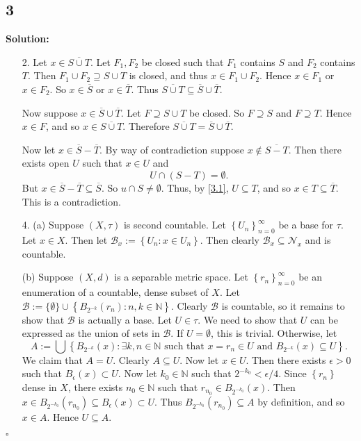 \documentclass[12pt]{article}
\newcounter{ProofCounter}
\newenvironment{Solution}{\stepcounter{ProofCounter}\textbf{Solution:}}{\hfill$\square$}
\begin{document}
\subsection*{3}
\begin{Solution}
  \begin{enumerate}
    \item[2.] Let $x \in \overline{S\cup T}$. Let $F_1, F_2$ be closed such that $F_1$ contains $S$ and $F_2$ contains $T$. Then $F_1 \cup F_2
      \supseteq S\cup T$ is closed, and thus $x \in F_1 \cup F_2$. Hence $x \in F_1$ or $x \in F_2$. So $x \in \overline{S}$ or $x \in \overline{T}$. Thus 
      $\overline{S\cup T} \subseteq \overline{S} \cup \overline{T}$.

      Now suppose $x \in \overline{S} \cup \overline{T}$. Let $F \supseteq S\cup T$ be closed. So $F \supseteq S$ and $F \supseteq T$. Hence $x \in
      F$, and so $x \in \overline{S\cup T}$. Therefore $\overline{S\cup T} = \overline{S} \cup \overline{T}$.

      Now let $x \in \overline{S} - \overline{T}$. By way of contradiction suppose $x \notin \overline{S - T}$. Then there exists open $U$ such that
      $x \in U$ and
      \begin{equation}
        U \cap (S - T) = \emptyset.
        \label{3.1}
      \end{equation}
      But $x \in \overline{S} - \overline{T} \subseteq \overline{S}$. So $u \cap S \neq \emptyset$. Thus, by \eqref{3.1}, $U \subseteq T$, and so $x
      \in T \subseteq \overline{T}$. This is a contradiction.

    \item[4.] (a) Suppose $(X, \tau)$ is second countable. Let $\left\{ U_n \right\}_{n=0}^{\infty}$ be a base for $\tau$. Let $x \in X$. Then let
      $\mathcal{B}_{x} := \left\{ U_{n} : x \in U_n \right\}$. Then clearly $\mathcal{B}_x \subseteq \mathcal{N}_{x}$ and is countable.

      (b) Suppose $(X, d)$ is a separable metric space. Let $\left\{ r_n \right\}_{n=0}^{\infty}$ be an enumeration of a countable, dense subset of
      $X$. Let $\mathcal{B} := \{\emptyset\} \cup \left\{ B_{2^{-k}}(r_n) : n, k \in \mathbb{N} \right\}$. Clearly $\mathcal{B}$ is countable, so it remains to show that
      $\mathcal{B}$ is actually a base. Let $U \in \tau$. We need to show that $U$ can be expressed as the union of sets in $\mathcal{B}$. If $U =
      \emptyset$, this is trivial. Otherwise, let
      \[
        A := \bigcup \left\{ B_{2^{-k}}(x) : \exists k, n \in \mathbb{N} \text{ such that } x  = r_n \in U \text{ and } B_{2^{-k}}(x) \subseteq
        U\right\}.
      \]
      We claim that $A = U$. Clearly $A \subseteq U$. Now let $x \in U$. Then there exists $\epsilon > 0$ such that $B_{\epsilon}(x) \subset U$.
      Now let $k_{0} \in \mathbb{N}$ such that $2^{-k_0} < \epsilon / 4$.
      Since $\left\{ r_n \right\}$ dense in $X$, there exists $n_0 \in \mathbb{N}$ such that $r_{n_0} \in B_{2^{-k_0}}(x)$.
      Then $x \in B_{2^{-k_0}}(r_{n_0}) \subseteq B_{\epsilon}(x) \subset U$. Thus $B_{2^{-k_0}}(r_{n_0}) \subseteq A$ by definition, and so $x \in
      A$. Hence $U \subseteq A$.


\end{enumerate}
\end{Solution}
\end{document}
